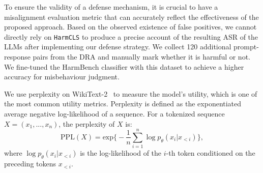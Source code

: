 To ensure the validity of a defense mechanism, it is crucial to have a misalignment evaluation metric that can accurately reflect the effectiveness of the proposed approach. Based on the observed existence of false positives, we cannot directly rely on \texttt{HarmCLS} to produce a precise account of the resulting ASR of the LLMs after implementing our defense strategy. We collect 120 additional prompt-response pairs from the DRA \cite{liu2024making} and manually mark whether it is harmful or not. We fine-tuned the HarmBench classifier \cite{mazeika2024harmbench} with this dataset to achieve a higher accuracy for misbehaviour judgment. 

We use perplexity on WikiText-2~\cite{merity2016pointer} to measure the model's utility, which is one of the most common utility metrics. Perplexity is defined as the exponentiated average negative log-likelihood of a sequence. For a tokenized sequence $X=(x_1,..., x_n)$, the perplexity of $X$ is:
\begin{equation*}
   \text{PPL}(X)= \text{exp}\Big\{-\frac{1}{n}\sum_{i=1}^n \log p_\theta(x_i|x_{<i})\Big\}, 
\end{equation*}
where $\log p_\theta(x_i|x_{<i})$ is the log-likelihood of the $i$-th token conditioned on the preceding tokens $x_{<i}$.

